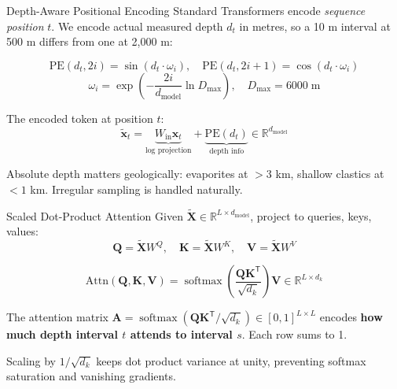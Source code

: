 \documentclass[aspectratio=169,11pt]{beamer}
\newcommand{\acc}[1]{{\color{Accent}#1}}
\newcommand{\mut}[1]{{\color{Muted}#1}}
\newcommand{\T}{\mathsf{T}}
\newcommand{\dmodel}{d_{\mathrm{model}}}
\newcommand{\dkey}{d_k}
\newcommand{\softmax}{\operatorname{softmax}}
\begin{document}
\begin{frame}{Depth-Aware Positional Encoding}
  Standard Transformers encode \emph{sequence position} $t$. We encode \acc{actual measured depth $d_t$ in metres}, so a 10 m interval at 500 m differs from one at 2,000 m:

  \vspace{0.6em}
  \[
    \text{PE}(d_t, 2i) = \sin\!\left(d_t \cdot \omega_i\right), \quad
    \text{PE}(d_t, 2i+1) = \cos\!\left(d_t \cdot \omega_i\right)
  \]
  \[
    \omega_i = \exp\!\left(-\frac{2i}{\dmodel} \ln D_{\max}\right), \quad D_{\max} = 6000\;\text{m}
  \]

  \vspace{0.6em}
  The encoded token at position $t$:
  \[
    \tilde{\mathbf{x}}_t = \underbrace{W_\text{in} \mathbf{x}_t}_{\text{log projection}} + \underbrace{\text{PE}(d_t)}_{\text{depth info}} \in \mathbb{R}^{\dmodel}
  \]

  \vspace{0.4em}
  \mut{Absolute depth matters geologically: evaporites at $>3$ km, shallow clastics at $<1$ km. Irregular sampling is handled naturally.}
\end{frame}

\begin{frame}{Scaled Dot-Product Attention}
  Given $\tilde{\mathbf{X}} \in \mathbb{R}^{L \times \dmodel}$, project to queries, keys, values:
  \[
    \mathbf{Q} = \tilde{\mathbf{X}} W^Q, \quad
    \mathbf{K} = \tilde{\mathbf{X}} W^K, \quad
    \mathbf{V} = \tilde{\mathbf{X}} W^V
  \]

  \vspace{0.4em}
  \[
    \mathrm{Attn}(\mathbf{Q}, \mathbf{K}, \mathbf{V}) = \softmax\!\left(\frac{\mathbf{Q} \mathbf{K}^{\T}}{\sqrt{\dkey}}\right) \mathbf{V} \in \mathbb{R}^{L \times \dkey}
  \]

  \vspace{0.8em}
  The attention matrix $\mathbf{A} = \softmax(\mathbf{Q}\mathbf{K}^{\T}/\sqrt{\dkey}) \in [0,1]^{L \times L}$ encodes \textbf{how much depth interval $t$ attends to interval $s$}. Each row sums to 1.

  \vspace{0.6em}
  \mut{Scaling by $1/\!\sqrt{\dkey}$ keeps dot product variance at unity, preventing softmax saturation and vanishing gradients.}
\end{frame}
\end{document}
